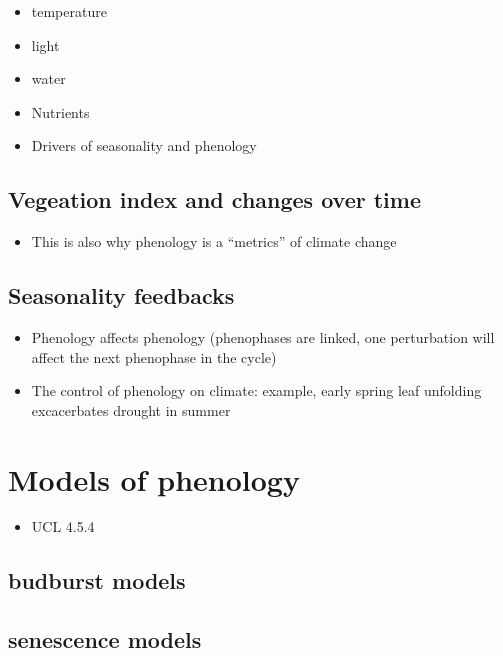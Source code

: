 \documentclass[oneside]{book}
\providecommand{\tightlist}{%
  \setlength{\itemsep}{0pt}\setlength{\parskip}{0pt}}
\begin{document}
\begin{itemize}
\tightlist
\item
  temperature
\item
  light
\item
  water
\item
  Nutrients
\item
  Drivers of seasonality and phenology
\end{itemize}

\subsection{Vegeation index and changes over
time}\label{vegeation-index-and-changes-over-time}

\begin{itemize}
\tightlist
\item
  This is also why phenology is a ``metrics'' of climate change
\end{itemize}

\subsection{Seasonality feedbacks}\label{seasonality-feedbacks}

\begin{itemize}
\tightlist
\item
  Phenology affects phenology (phenophases are linked, one perturbation
  will affect the next phenophase in the cycle)
\item
  The control of phenology on climate: example, early spring leaf
  unfolding excacerbates drought in summer
\end{itemize}

\section{Models of phenology}\label{models-of-phenology}

\begin{itemize}
\tightlist
\item
  UCL 4.5.4
\end{itemize}

\subsection{budburst models}\label{budburst-models}

\subsection{senescence models}\label{senescence-models}
\end{document}

